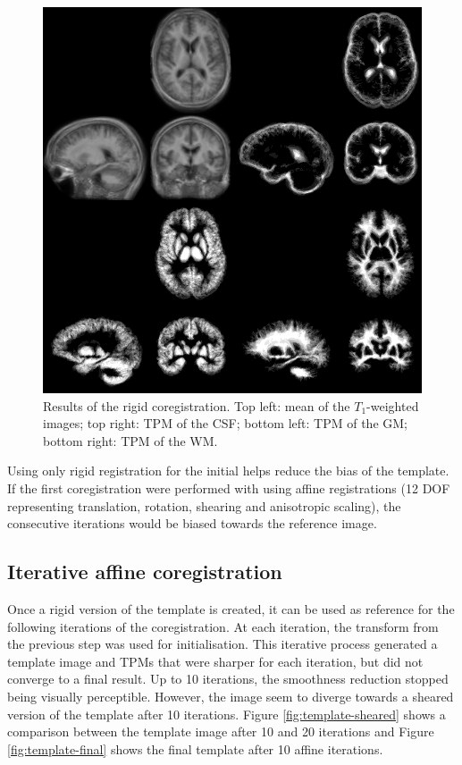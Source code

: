 \begin{figure}
  \centering
  \includegraphics[width=\textwidth]{figures/rigid_template_collage}
  \caption{Results of the rigid coregistration. Top left: mean of the $T_1$-weighted images; top right: TPM of the CSF; bottom left: TPM of the GM; bottom right: TPM of the WM.}
  \label{fig:template-rigid}
\end{figure}

Using only rigid registration for the initial helps reduce the bias of the template. If the first coregistration were performed with using affine registrations (12 DOF representing translation, rotation, shearing and anisotropic scaling), the consecutive iterations would be biased towards the reference image.


\subsection{Iterative affine coregistration}
Once a rigid version of the template is created, it can be used as reference for the following iterations of the coregistration. At each iteration, the transform from the previous step was used for initialisation. This iterative process generated a template image and TPMs that were sharper for each iteration, but did not converge to a final result. Up to 10 iterations, the smoothness reduction stopped being visually perceptible. However, the image seem to diverge towards a sheared version of the template after 10 iterations. Figure \ref{fig:template-sheared} shows a comparison between the template image after 10 and 20 iterations and Figure \ref{fig:template-final} shows the final template after 10 affine iterations.


